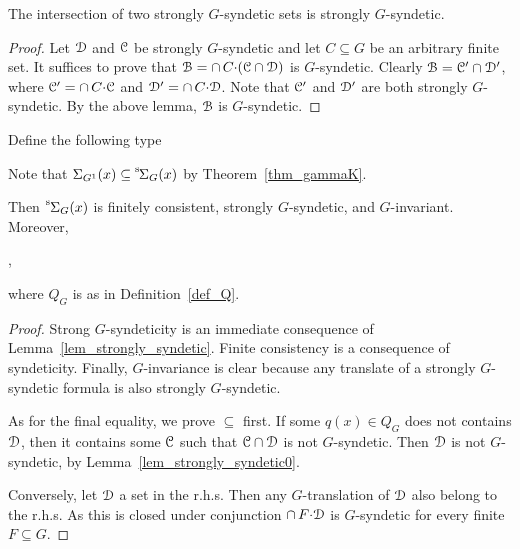 \begin{lemma}\label{lem_strongly_syndetic}
  The intersection of two strongly $G$-syndetic sets is strongly $G$-syndetic.
\end{lemma}

\begin{proof}
  Let $\EuScript D$ and $\EuScript C$ be strongly $G$-syndetic and let $C\subseteq G$ be an arbitrary finite set.
  It suffices to prove that $\EuScript B=\cap\, C{\cdot}(\EuScript C\cap\EuScript D)$ is $G$-syndetic. 
  Clearly $\EuScript B=\EuScript C'\cap\EuScript D'$, where $\EuScript C'=\cap\, C{\cdot}\EuScript C$ and $\EuScript D'=\cap\, C{\cdot}\EuScript D$.
  Note that $\EuScript C'$ and $\EuScript D'$ are both strongly $G$-syndetic.
  By the above lemma, $\EuScript B$ is $G$-syndetic.
\end{proof}

Define the following type

\smallskip

Note that $\Sigma_{G^1}(x)\subseteq{\mathstrut}^{\rm s}\kern-.2ex\Sigma_G(x)$ by Theorem~\ref{thm_gammaK}.

\begin{corollary}\label{corol_str_gen}
  Then ${\mathstrut}^{\rm s}\kern-.1ex\Sigma_G(x)$ is finitely consistent, strongly $G$-syn\-detic, and $G$-invariant.
  Moreover, \smallskip

  ,\smallskip
 
  where $Q_G$ is as in Definition~\ref{def_Q}.
\end{corollary}

\begin{proof}
  Strong $G$-syndeticity is an immediate consequence of Lemma~\ref{lem_strongly_syndetic}.
  Finite consistency is a consequence of syndeticity.
  Finally, $G$-invariance is clear because any translate of a strongly $G$-syndetic formula is also strongly $G$-syndetic.

  As for the final equality, we prove $\subseteq$ first.
  If some $q(x)\in Q_G$ does not contains $\EuScript D$, then it contains some $\EuScript C$ such that $\EuScript C\cap\EuScript D$ is not $G$-syndetic.
  Then $\EuScript D$ is not $G$-syndetic, by Lemma~\ref{lem_strongly_syndetic0}.

  Conversely, let $\EuScript D$ a set in the r.h.s.
  Then any $G$-translation of $\EuScript D$ also belong to the r.h.s.
  As this is closed under conjunction $\cap\,F{\cdot}\EuScript D$ is $G$-syndetic for every finite $F\subseteq G$. 
\end{proof}

